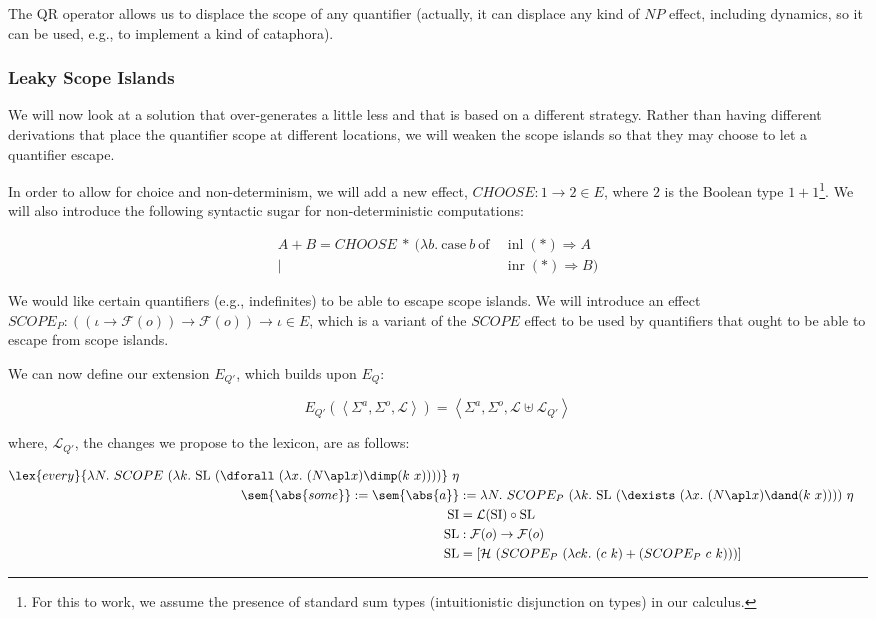 The QR operator allows us to displace the scope of any quantifier
(actually, it can displace any kind of $NP$ effect, including dynamics, so
it can be used, e.g., to implement a kind of cataphora).

\subsubsection{Leaky Scope Islands}

We will now look at a solution that over-generates a little less and that
is based on a different strategy. Rather than having different derivations
that place the quantifier scope at different locations, we will weaken the
scope islands so that they may choose to let a quantifier escape.

In order to allow for choice and non-determinism, we will add a new effect,
$CHOOSE : 1 \to 2 \in E$, where $2$ is the Boolean type $1 +
1$\footnote{For this to work, we assume the presence of standard sum types
  (intuitionistic disjunction on types) in our calculus.}. We will also
introduce the following syntactic sugar for non-deterministic computations:

\begin{align*}
A + B = CHOOSE\ *\ (\lambda b.\ \text{case}\ b\ \text{of}\ &\operatorname{inl}(*) \Rightarrow A \\
|\ &\operatorname{inr}(*) \Rightarrow B)
\end{align*}

We would like certain quantifiers (e.g., indefinites) to be able to escape
scope islands. We will introduce an effect $SCOPE_P : ((\iota \to
\mathcal{F}(o)) \to \mathcal{F}(o)) \to \iota \in E$, which is a variant of
the $SCOPE$ effect to be used by quantifiers that ought to be able to
escape from scope islands.

We can now define our extension $E_{Q'}$, which builds upon $E_Q$:

$$
E_{Q'}(\left< \Sigma^a, \Sigma^o, \mathcal{L} \right>) =
\left< \Sigma^a, \Sigma^o, \mathcal{L} \uplus \mathcal{L}_{Q'} \right>
$$

where, $\mathcal{L}_{Q'}$, the changes we propose to the lexicon, are as
follows:

\begin{align*}
  \lex{every}{\lambda N.\ SCOPE\ (\lambda k.\ \mathrm{SL}\ (\dforall\ (\lambda x.\ (N \apl x) \dimp (k\ x))))}\ \eta \\
  \sem{\abs{some}} := \sem{\abs{a}} &:= \lambda N.\ SCOPE_P\ (\lambda k.\ \mathrm{SL}\ (\dexists\ (\lambda x.\ (N \apl x) \dand (k\ x))))\ \eta \\
  \mathrm{SI} &= \mathcal{L}(\mathrm{SI}) \circ \mathrm{SL} \\
  \mathrm{SL} &: \mathcal{F}(o) \to \mathcal{F}(o) \\
  \mathrm{SL} &= [\mathcal{H}\ (SCOPE_P\ (\lambda c k.\ (c\ k) + (SCOPE_P\ c\ k)))] 
\end{align*}

